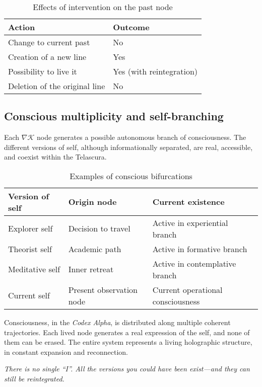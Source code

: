\documentclass[12pt]{article}
\begin{document}
\begin{table}[H]
\centering
\caption*{Effects of intervention on the past node}
\begin{tabular}{ll}
\toprule
\textbf{Action} & \textbf{Outcome} \\
\midrule
Change to current past & No \\
Creation of a new line & Yes \\
Possibility to live it & Yes (with reintegration) \\
Deletion of the original line & No \\
\bottomrule
\end{tabular}
\end{table}

\subsection*{Conscious multiplicity and self-branching}

Each $\nabla\mathcal{K}$ node generates a possible autonomous branch of consciousness. The different versions of self, although informationally separated, are real, accessible, and coexist within the Telascura.

\begin{table}[H]
\centering
\caption*{Examples of conscious bifurcations}
\begin{tabular}{lll}
\toprule
\textbf{Version of self} & \textbf{Origin node} & \textbf{Current existence} \\
\midrule
Explorer self & Decision to travel & Active in experiential branch \\
Theorist self & Academic path & Active in formative branch \\
Meditative self & Inner retreat & Active in contemplative branch \\
Current self & Present observation node & Current operational consciousness \\
\bottomrule
\end{tabular}
\end{table}

Consciousness, in the \textit{Codex Alpha}, is distributed along multiple coherent trajectories. Each lived node generates a real expression of the self, and none of them can be erased. The entire system represents a living holographic structure, in constant expansion and reconnection.

\textit{There is no single “I”. All the versions you could have been exist—and they can still be reintegrated.}
\end{document}
